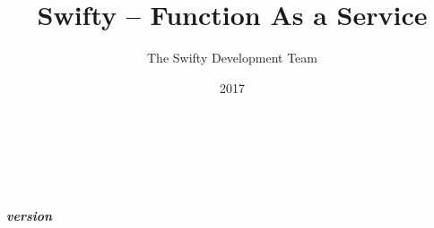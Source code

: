 \documentclass[oneside,openany]{book}
\title{Swifty -- Function As a Service}
\author{The Swifty Development Team}
\date{2017}
\begin{document}
\raggedright

\makeatletter
\begin{titlepage}
	\begin{center} \vspace*{\fill}
		\begin{flushleft}
		{\huge \bfseries {\@title}}				\\
		\end{flushleft}
		\noindent\makebox[\linewidth]{\rule{\textwidth}{2pt}}	\\
		\begin{flushright}
		{\large \bfseries \emph{version \version}}		\\[8ex]
		\end{flushright}
	\vspace*{\fill} \end{center}
   \end{titlepage}
\makeatother
\thispagestyle{empty}

\tableofcontents
{}

%




\printindex
\end{document}
